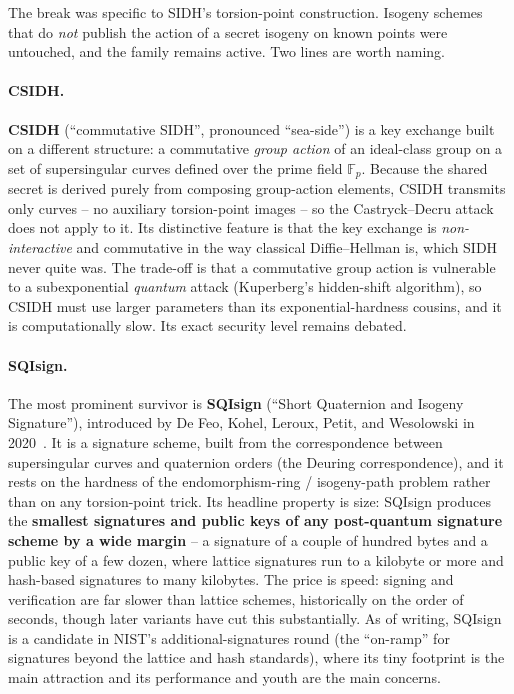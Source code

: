 The break was specific to SIDH's torsion-point construction. Isogeny schemes that do \emph{not} publish the action of a secret isogeny on known points were untouched, and the family remains active. Two lines are worth naming.

\paragraph{CSIDH.}
\textbf{CSIDH} (``commutative SIDH'', pronounced ``sea-side'') is a key exchange built on a different structure: a commutative \emph{group action} of an ideal-class group on a set of supersingular curves defined over the prime field $\mathbb{F}_p$. Because the shared secret is derived purely from composing group-action elements, CSIDH transmits only curves -- no auxiliary torsion-point images -- so the Castryck--Decru attack does not apply to it. Its distinctive feature is that the key exchange is \emph{non-interactive} and commutative in the way classical Diffie--Hellman is, which SIDH never quite was. The trade-off is that a commutative group action is vulnerable to a subexponential \emph{quantum} attack (Kuperberg's hidden-shift algorithm), so CSIDH must use larger parameters than its exponential-hardness cousins, and it is computationally slow. Its exact security level remains debated.

\paragraph{SQIsign.}
The most prominent survivor is \textbf{SQIsign} (``Short Quaternion and Isogeny Signature''), introduced by De Feo, Kohel, Leroux, Petit, and Wesolowski in 2020~\cite{sqisign2020}. It is a signature scheme, built from the correspondence between supersingular curves and quaternion orders (the Deuring correspondence), and it rests on the hardness of the endomorphism-ring / isogeny-path problem rather than on any torsion-point trick. Its headline property is size: SQIsign produces the \textbf{smallest signatures and public keys of any post-quantum signature scheme by a wide margin} -- a signature of a couple of hundred bytes and a public key of a few dozen, where lattice signatures run to a kilobyte or more and hash-based signatures to many kilobytes. The price is speed: signing and verification are far slower than lattice schemes, historically on the order of seconds, though later variants have cut this substantially. As of writing, SQIsign is a candidate in NIST's additional-signatures round (the ``on-ramp'' for signatures beyond the lattice and hash standards), where its tiny footprint is the main attraction and its performance and youth are the main concerns.

